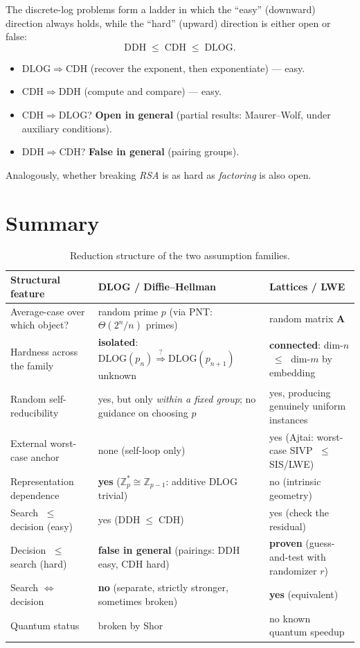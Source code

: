 \documentclass[11pt]{article}
\theoremstyle{definition}
\theoremstyle{plain}
\theoremstyle{remark}
\newcommand{\Z}{\mathbb{Z}}
\newcommand{\vA}{\mathbf{A}}
\newcommand{\dlog}{\mathrm{DLOG}}
\newcommand{\cdh}{\mathrm{CDH}}
\newcommand{\ddh}{\mathrm{DDH}}
\newcommand{\reduces}{\;\leq\;}
\begin{document}
The discrete-log problems form a ladder in which the ``easy'' (downward) direction always
holds, while the ``hard'' (upward) direction is either open or false:
\[
   \ddh \reduces \cdh \reduces \dlog .
\]
\begin{itemize}[leftmargin=1.5em,nosep]
  \item $\dlog\Rightarrow\cdh$ (recover the exponent, then exponentiate) --- easy.
  \item $\cdh\Rightarrow\ddh$ (compute and compare) --- easy.
  \item $\cdh\Rightarrow\dlog$? \textbf{Open in general} (partial results: Maurer--Wolf,
        under auxiliary conditions).
  \item $\ddh\Rightarrow\cdh$? \textbf{False in general} (pairing groups).
\end{itemize}
Analogously, whether breaking \emph{RSA} is as hard as \emph{factoring} is also open.

\section{Summary}

\begin{table}[h]
\centering
\renewcommand{\arraystretch}{1.35}
\begin{tabular}{@{}p{} p{} p{}@{}}
\toprule
\textbf{Structural feature} & \textbf{DLOG / Diffie--Hellman} & \textbf{Lattices / LWE} \\
\midrule
Average-case over which object?
  & random prime $p$ (via PNT: $\Theta(2^n/n)$ primes)
  & random matrix $\vA$ \\
Hardness across the family
  & \textbf{isolated}: $\dlog(p_n)\overset{?}{\Rightarrow}\dlog(p_{n+1})$ unknown
  & \textbf{connected}: dim-$n$ $\reduces$ dim-$m$ by embedding \\
Random self-reducibility
  & yes, but only \emph{within a fixed group}; no guidance on choosing $p$
  & yes, producing genuinely uniform instances \\
External worst-case anchor
  & none (self-loop only)
  & yes (Ajtai: worst-case SIVP $\reduces$ SIS/LWE) \\
Representation dependence
  & \textbf{yes} ($\Z_p^*\!\cong\!\Z_{p-1}$: additive DLOG trivial)
  & no (intrinsic geometry) \\
Search $\reduces$ decision (easy)
  & yes ($\ddh\reduces\cdh$)
  & yes (check the residual) \\
Decision $\reduces$ search (hard)
  & \textbf{false in general} (pairings: DDH easy, CDH hard)
  & \textbf{proven} (guess-and-test with randomizer $r$) \\
Search $\Leftrightarrow$ decision
  & \textbf{no} (separate, strictly stronger, sometimes broken)
  & \textbf{yes} (equivalent) \\
Quantum status
  & broken by Shor
  & no known quantum speedup \\
\bottomrule
\end{tabular}
\caption{Reduction structure of the two assumption families.}
\end{table}
\end{document}
